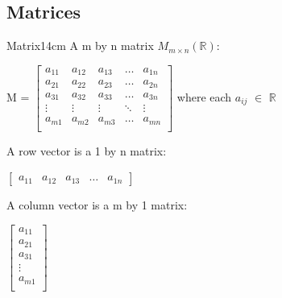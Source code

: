     \newpage





\subsection{ Matrices }

    \begin{definition}{Matrix}{14cm}
        A {\color{lblue} m by n matrix} $M_{m \times n}(\mathbb{R})$:

        \hspace{0.5cm}
        M =
        $
        \begin{bmatrix}
            a_{11} & a_{12} & a_{13} & \hdots & a_{1n} \\
            a_{21} & a_{22} & a_{23} & \hdots & a_{2n} \\
            a_{31} & a_{32} & a_{33} & \hdots & a_{3n} \\
            \vdots & \vdots & \vdots & \ddots & \vdots \\
            a_{m1} & a_{m2} & a_{m3} & \hdots & a_{mn} \\
        \end{bmatrix}
        $
        \hspace{1cm}
        where each $a_{ij}$ $\in$ $\mathbb{R}$

        \vspace{0.3cm}



        A {\color{lblue} row vector} is a 1 by n matrix:

        \hspace{0.5cm}
        $
        \begin{bmatrix}
            a_{11} & a_{12} & a_{13} & \hdots & a_{1n}
        \end{bmatrix}
        $

        \vspace{0.3cm}



        A {\color{lblue} column vector} is a m by 1 matrix:

        \hspace{0.5cm}
        $
        \begin{bmatrix}
            a_{11} \\
            a_{21} \\
            a_{31} \\
            \vdots \\
            a_{m1} \\
        \end{bmatrix}
        $


\end{definition}

